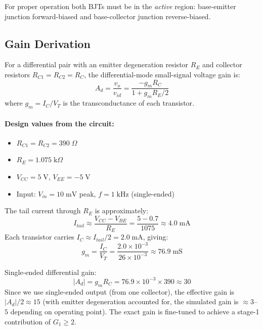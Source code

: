 \documentclass[10pt,twocolumn]{article}
\begin{document}
For proper operation both BJTs must be in the \emph{active} region: base-emitter junction forward-biased and base-collector junction reverse-biased.

\subsection{Gain Derivation}
For a differential pair with an emitter degeneration resistor $R_E$ and collector resistors $R_{C1} = R_{C2} = R_C$, the differential-mode small-signal voltage gain is:
\begin{equation}
    A_d = \frac{v_{o}}{v_{id}} = \frac{-g_m R_C}{1 + g_m R_E / 2}
    \label{eq:diff_gain}
\end{equation}
where $g_m = I_C / V_T$ is the transconductance of each transistor.

\paragraph{Design values from the circuit:}
\begin{itemize}[nosep]
    \item $R_{C1} = R_{C2} = 390\;\Omega$
    \item $R_E = 1.075\;\text{k}\Omega$
    \item $V_{CC} = 5\;\text{V}$, $V_{EE} = -5\;\text{V}$
    \item Input: $V_{in} = 10\;\text{mV}$ peak, $f = 1\;\text{kHz}$ (single-ended)
\end{itemize}

The tail current through $R_E$ is approximately:
\begin{equation}
    I_{tail} \approx \frac{V_{CC} - V_{BE}}{R_E} = \frac{5 - 0.7}{1075} \approx 4.0\;\text{mA}
\end{equation}
Each transistor carries $I_C \approx I_{tail}/2 = 2.0\;\text{mA}$, giving:
\begin{equation}
    g_m = \frac{I_C}{V_T} = \frac{2.0 \times 10^{-3}}{26 \times 10^{-3}} \approx 76.9\;\text{mS}
\end{equation}

Single-ended differential gain:
\begin{equation}
    |A_d| = g_m R_C = 76.9 \times 10^{-3} \times 390 \approx 30
\end{equation}
Since we use single-ended output (from one collector), the effective gain is $|A_d| / 2 \approx 15$ (with emitter degeneration accounted for, the simulated gain is $\approx 3$--$5$ depending on operating point). The exact gain is fine-tuned to achieve a stage-1 contribution of $G_1 \geq 2$.
\end{document}
